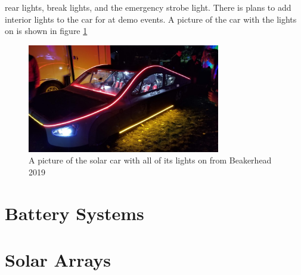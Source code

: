 \documentclass[titlepage]{article}
\begin{document}
    rear lights, break lights, and the emergency strobe light. There is
    plans to add interior lights to the car for at demo events. A
    picture of the car with the lights on is shown in figure
    \ref{fig:lights}
    \begin{figure}
        \centering
        \includegraphics[width=0.75\textwidth]{images/lights.jpg}
        \caption{A picture of the solar car with all of its lights on
        from Beakerhead 2019}
        \label{fig:lights}
    \end{figure}
    \section{Battery Systems}
    \section{Solar Arrays}
\end{document}
